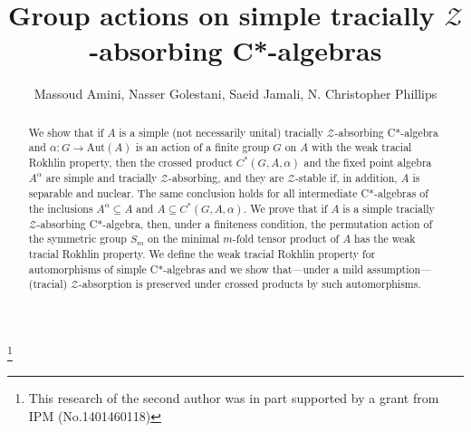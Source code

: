 \documentclass[11pt]{amsart}
\theoremstyle{plain}
\theoremstyle{definition}
\theoremstyle{remark}
\numberwithin{equation}{section}
\begin{document}
\title[Actions on  tracially $\mathcal{Z}$-absorbing C*-algebras]{Group actions on simple tracially $\mathcal{Z}$-absorbing C*-algebras}



\author[M. Amini, N. Golestani,  S. Jamali, N. C. Phillips]{
  Massoud Amini, Nasser Golestani, Saeid Jamali,
  N. Christopher Phillips}


\address{{\textbf{M. Amini, N. Golestani, S. Jamali}} \newline
           Faculty of Mathematical Sciences, Tarbiat Modares University
\\
           Tehran 14115-134
\newline
              {\textbf{N. C. Phillips}} \newline
   Department of Mathematics, University of Oregon
\\
   Eugene OR 97403-1222}
\thanks{This research of the second author was
 in part supported by a grant from IPM (No.1401460118)}



\begin{abstract}
We show that if $A$ is a simple
(not necessarily unital) tracially $\mathcal{Z}$-absorbing C*-algebra
and  $\alpha \colon G \to \mathrm{Aut} (A)$ is an
action of a finite group $G$ on $A$  with the weak tracial Rokhlin
property, then
the crossed product $C^*(G, A,\alpha)$ and the fixed point
algebra $A^\alpha$ are simple and tracially $\mathcal{Z}$-absorbing,
and they are $\mathcal{Z}$-stable if, in addition, $A$ is 
separable and nuclear. The same conclusion
holds for all intermediate C*-algebras of the inclusions
$A^\alpha \subseteq A$ and $A \subseteq C^*(G, A,\alpha)$.
We  prove that if $A$
is a simple tracially $\mathcal{Z}$-absorbing C*-algebra,
then, under a finiteness condition,
the permutation action of the symmetric group $S_m$
on the minimal $m$-fold tensor product of $A$
has the weak tracial Rokhlin property.
We define the weak tracial Rokhlin property for automorphisms
of simple  C*-algebras
and we show that---under
a mild assumption---(tracial) $\mathcal{Z}$-absorption is
preserved under crossed products by such automorphisms.
\end{abstract}
\end{document}
